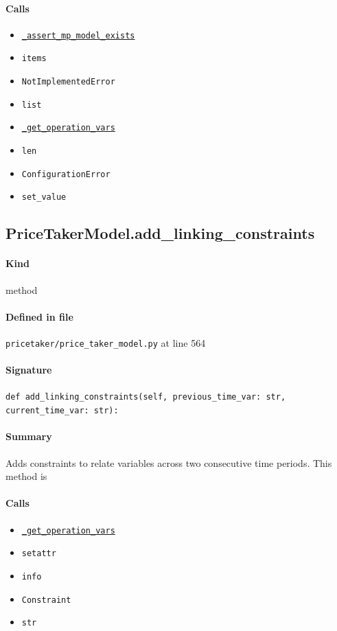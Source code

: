 \documentclass[11pt]{report}
\begin{document}
\paragraph{Calls}
\begin{itemize}[leftmargin=*]
  \item \hyperref[def:pricetaker-price_taker_model.py:PriceTakerModel._assert_mp_model_exists:L283]{\texttt{\_assert\_mp\_model\_exists}}
  \item \texttt{items}
  \item \texttt{NotImplementedError}
  \item \texttt{list}
  \item \hyperref[def:pricetaker-price_taker_model.py:PriceTakerModel._get_operation_vars:L482]{\texttt{\_get\_operation\_vars}}
  \item \texttt{len}
  \item \texttt{ConfigurationError}
  \item \texttt{set\_value}
\end{itemize}
\subsection{PriceTakerModel.add\_linking\_constraints}
\label{def:pricetaker-price_taker_model.py:PriceTakerModel.add_linking_constraints:L564}
\paragraph{Kind} method
\paragraph{Defined in file} \texttt{pricetaker/price\_taker\_model.py} at line 564
\paragraph{Signature} \texttt{def add\_linking\_constraints(self, previous\_time\_var: str, current\_time\_var: str):}
\paragraph{Summary} Adds constraints to relate variables across two consecutive time periods. This method is
\paragraph{Calls}
\begin{itemize}[leftmargin=*]
  \item \hyperref[def:pricetaker-price_taker_model.py:PriceTakerModel._get_operation_vars:L482]{\texttt{\_get\_operation\_vars}}
  \item \texttt{setattr}
  \item \texttt{info}
  \item \texttt{Constraint}
  \item \texttt{str}
\end{itemize}
\end{document}
